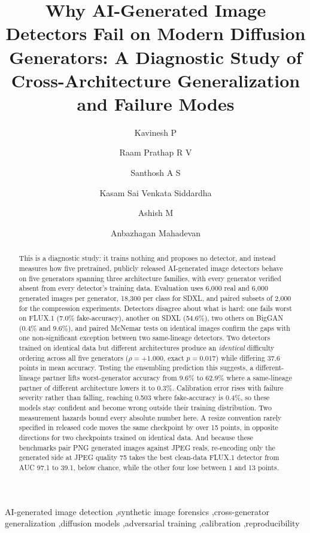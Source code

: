\documentclass[3p,times,procedia]{elsarticle}
\begin{document}
\begin{frontmatter}


\title{Why AI-Generated Image Detectors Fail on Modern Diffusion
Generators: A Diagnostic Study of Cross-Architecture Generalization and
Failure Modes}

\author[a]{Kavinesh P}
\author[a]{Raam Prathap R V}
\author[a]{Santhosh A S}
\author[a]{Kasam Sai Venkata Siddardha}
\author[a]{Ashish M}
\author[a]{Anbazhagan Mahadevan}

\address[a]{Department of Computer Science and Engineering, Amrita School of Computing, Coimbatore 641112, Amrita Vishwa Vidyapeetham, India}

\begin{abstract}
This is a diagnostic study: it trains nothing and proposes no detector,
and instead measures how five pretrained, publicly released AI-generated
image detectors behave on five generators spanning three architecture
families, with every generator verified absent from every detector's
training data. Evaluation uses 6{,}000 real and 6{,}000 generated images
per generator, 18{,}300 per class for SDXL, and paired subsets of 2{,}000
for the compression experiments. Detectors disagree about what is hard:
one fails worst on FLUX.1 (7.0\% fake-accuracy), another on SDXL (54.6\%),
two others on BigGAN (0.4\% and 9.6\%), and paired McNemar tests on
identical images confirm the gaps with one non-significant exception
between two same-lineage detectors. Two detectors trained on identical
data but different architectures produce an \emph{identical} difficulty
ordering across all five generators ($\rho=+1.000$, exact $p=0.017$) while
differing 37.6 points in mean accuracy. Testing the ensembling prediction
this suggests, a different-lineage partner lifts worst-generator accuracy
from 9.6\% to 62.9\% where a same-lineage partner of different
architecture lowers it to 0.3\%. Calibration error rises with failure
severity rather than falling, reaching 0.503 where fake-accuracy is 0.4\%,
so these models stay confident and become wrong outside their training
distribution. Two measurement hazards bound every absolute number here. A
resize convention rarely specified in released code moves the same
checkpoint by over 15 points, in opposite directions for two checkpoints
trained on identical data. And because these benchmarks pair PNG generated
images against JPEG reals, re-encoding only the generated side at JPEG
quality 75 takes the best clean-data FLUX.1 detector from AUC 97.1 to
39.1, below chance, while the other four lose between 1 and 13 points.
\end{abstract}

\begin{keyword}
AI-generated image detection \sep synthetic image forensics \sep cross-generator generalization \sep diffusion models \sep adversarial training \sep calibration \sep reproducibility
\end{keyword}
\end{frontmatter}
\end{document}
